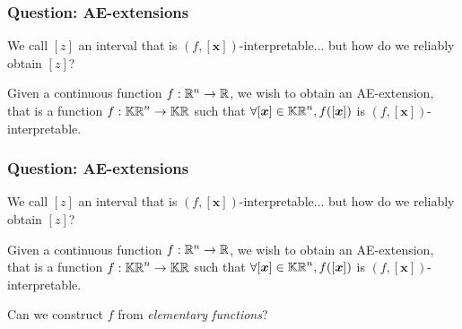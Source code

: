 \documentclass{beamer}
\begin{document}
\begin{frame}
    \frametitle{Question: AE-extensions}
 
    We call $[z]$ an interval that is $(f,[\bm{x}])$-interpretable... but how do we reliably obtain $[z]$?

    \vspace{7mm}
    Given a continuous function $f: \mathbb R^n \rightarrow \mathbb R$, we wish to obtain an AE-extension, that is a function $f: \mathbb{KR}^n \rightarrow \mathbb{KR}$ such that $\forall [\bm{x}] \in \mathbb{KR}^n, f([\bm{x}])$ is $(f, [\bm{x}])$-interpretable.

\end{frame}


\begin{frame}
    \frametitle{Question: AE-extensions}
 
    We call $[z]$ an interval that is $(f,[\bm{x}])$-interpretable... but how do we reliably obtain $[z]$?

    \vspace{7mm}
    Given a continuous function $f: \mathbb R^n \rightarrow \mathbb R$, we wish to obtain an AE-extension, that is a function $f: \mathbb{KR}^n \rightarrow \mathbb{KR}$ such that $\forall [\bm{x}] \in \mathbb{KR}^n, f([\bm{x}])$ is $(f, [\bm{x}])$-interpretable.

    \vspace{7mm}
    Can we construct $f$ from \textit{elementary functions}?

\end{frame}
\end{document}
